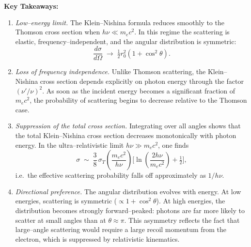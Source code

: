\begin{remark}
    \textbf{Key Takeaways:}
    \begin{enumerate}
        \item \emph{Low--energy limit.}  
              The Klein--Nishina formula reduces smoothly to the Thomson
              cross section when $h\nu \ll m_e c^2$. In this regime the
              scattering is elastic, frequency--independent, and the
              angular distribution is symmetric:
              \[
                  \frac{d\sigma}{d\Omega} \;\to\;
                  \tfrac{1}{2} r_0^2 (1+\cos^2\theta).
              \]

        \item \emph{Loss of frequency independence.}  
              Unlike Thomson scattering, the Klein--Nishina cross section
              depends explicitly on photon energy through the factor
              $(\nu'/\nu)^2$. As soon as the incident energy becomes a
              significant fraction of $m_e c^2$, the probability of
              scattering begins to decrease relative to the Thomson
              case.

        \item \emph{Suppression of the total cross section.}  
              Integrating over all angles shows that the total
              Klein--Nishina cross section decreases monotonically with
              photon energy. In the ultra--relativistic limit
              $h\nu \gg m_e c^2$, one finds
              \[
                  \sigma \;\sim\; 
                  \frac{3}{8}\,\sigma_T
                  \left(\frac{m_e c^2}{h\nu}\right)
                  \Bigg[\ln\!\left(\frac{2h\nu}{m_e c^2}\right) + \tfrac{1}{2}\Bigg],
              \]
              i.e.~the effective scattering probability falls off
              approximately as $1/h\nu$.

        \item \emph{Directional preference.}  
              The angular distribution evolves with energy. At low
              energies, scattering is symmetric
              ($\propto 1+\cos^2\theta$). At high energies, the
              distribution becomes strongly forward--peaked: photons are
              far more likely to scatter at small angles than at
              $\theta\approx\pi$. This asymmetry reflects the fact that
              large--angle scattering would require a large recoil
              momentum from the electron, which is suppressed by
              relativistic kinematics.
    \end{enumerate}
\end{remark}

